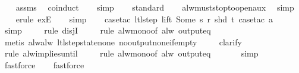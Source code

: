 \begin{isabellebody}
{\isanewline}%
%
\isadelimproof
\ \ %
\endisadelimproof
%
\isatagproof
{}\isamarkupfalse%
\ assms\ \isamarkupfalse%
\ coinduct\isanewline
\ \ \isamarkupfalse%
\ simp\isanewline
\ \ \isamarkupfalse%
\ standard\isanewline
\ \ \isamarkupfalse%
\ alw{\isacharunderscore}must{\isacharunderscore}stop{\isacharunderscore}to{\isacharunderscore}open{\isacharunderscore}aux\ \isamarkupfalse%
\ simp\isanewline
\ \ \isamarkupfalse%
\ {\isacharparenleft}erule\ exE{\isacharparenright}{\isacharplus}\isanewline
\ \ \isamarkupfalse%
\ simp\isanewline
\ \ \isamarkupfalse%
\ {\isacharparenleft}case{\isacharunderscore}tac\ {\isachardoublequoteopen}ltl{\isacharunderscore}step\ lift\ {\isacharparenleft}Some\ s{\isacharparenright}\ r\ {\isacharparenleft}shd\ t{\isacharparenright}{\isachardoublequoteclose}{\isacharcomma}\ case{\isacharunderscore}tac\ a{\isacharparenright}\isanewline
\ \ \ \isamarkupfalse%
\ simp\isanewline
\ \ \ \isamarkupfalse%
\ {\isacharparenleft}rule\ disjI{}{\isacharparenright}\isanewline
\ \ \ \isamarkupfalse%
\ {\isacharparenleft}rule\ alw{\isacharunderscore}mono{\isacharbrackleft}of\ {\isachardoublequoteopen}alw\ {\isacharparenleft}output{\isacharunderscore}eq\ {\isacharbrackleft}{\isacharbrackright}{\isacharparenright}{\isachardoublequoteclose}{\isacharbrackright}{\isacharparenright}\isanewline
\ \ \ \ \isamarkupfalse%
\ {\isacharparenleft}metis\ alw{\isacharunderscore}alw\ ltl{\isacharunderscore}step{\isacharunderscore}state{\isacharunderscore}none\ no{\isacharunderscore}output{\isacharunderscore}none{\isacharunderscore}if{\isacharunderscore}empty{\isacharparenright}\isanewline
\ \ \ \isamarkupfalse%
\ clarify\isanewline
\ \ \ \isamarkupfalse%
\ {\isacharparenleft}rule\ alw{\isacharunderscore}implies{\isacharunderscore}until{\isacharparenright}\isanewline
\ \ \ \isamarkupfalse%
\ {\isacharparenleft}rule\ alw{\isacharunderscore}mono{\isacharbrackleft}of\ {\isachardoublequoteopen}alw\ {\isacharparenleft}output{\isacharunderscore}eq\ {\isacharbrackleft}{\isacharbrackright}{\isacharparenright}{\isachardoublequoteclose}{\isacharbrackright}{\isacharparenright}\isanewline
\ \ \ \ \isamarkupfalse%
\ simp\isanewline
\ \ \ \isamarkupfalse%
\ fastforce\isanewline
\ \ \isamarkupfalse%
\ fastforce%
\endisatagproof
{\isafoldproof}%

\end{isabellebody}

